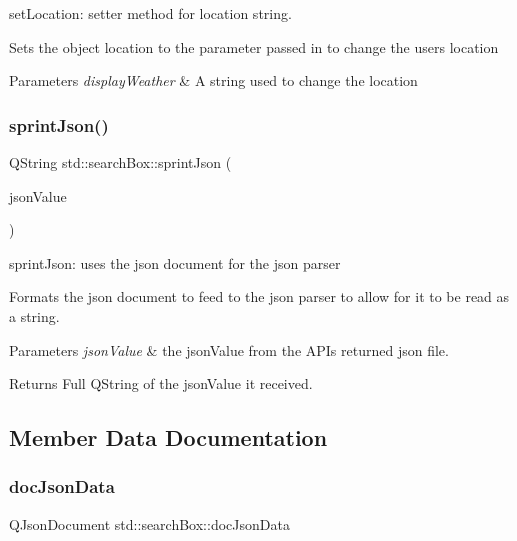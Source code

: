set\+Location\+: setter method for location string. 

Sets the object location to the parameter passed in to change the users location 
\begin{DoxyParams}{Parameters}
{\em display\+Weather} & A string used to change the location \\
\hline
\end{DoxyParams}
\mbox{\label{classstd_1_1searchBox_a4062270742fd88230f11182f34a854a2}} 
\subsubsection{\texorpdfstring{sprint\+Json()}{sprintJson()}}
{\footnotesize\ttfamily Q\+String std\+::search\+Box\+::sprint\+Json (\begin{DoxyParamCaption}\item[{const Q\+Json\+Value \&}]{json\+Value }\end{DoxyParamCaption})}



sprint\+Json\+: uses the json document for the json parser 

Formats the json document to feed to the json parser to allow for it to be read as a string. 
\begin{DoxyParams}{Parameters}
{\em json\+Value} & the json\+Value from the A\+PI\textquotesingle{}s returned json file. \\
\hline
\end{DoxyParams}
\begin{DoxyReturn}{Returns}
Full Q\+String of the json\+Value it received. 
\end{DoxyReturn}


\subsection{Member Data Documentation}
\mbox{\label{classstd_1_1searchBox_a6a9fbaeaa1c7aa1404e4f2c3baf6fd84}} 
\subsubsection{\texorpdfstring{doc\+Json\+Data}{docJsonData}}
{\footnotesize\ttfamily Q\+Json\+Document std\+::search\+Box\+::doc\+Json\+Data\hspace{0.3cm}{\ttfamily [private]}}

